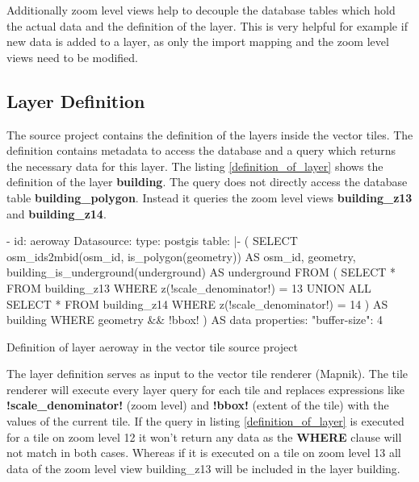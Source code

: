 Additionally zoom level views help to decouple the database tables which hold the actual data and the definition of the layer. This is very helpful for example if new data is added to a layer, as only the import mapping and the zoom level views need to be modified.

\subsection{Layer Definition}

The source project contains the definition of the layers inside the vector tiles. The definition contains metadata to access the database and a query which returns the necessary data for this layer. The listing \autoref{definition_of_layer} shows the definition of the layer \textbf{building}. The query does not directly access the database table \textbf{building\_polygon}. Instead it queries the zoom level views \textbf{building\_z13} and \textbf{building\_z14}.

\begin{listing}[H]
\begin{yamlcode}
- id: aeroway
    Datasource: 
      type: postgis
      table: |-
        (
          SELECT osm_ids2mbid(osm_id, is_polygon(geometry)) AS osm_id,
                 geometry, building_is_underground(underground) AS underground 
          FROM (
            SELECT * FROM building_z13
            WHERE z(!scale_denominator!) = 13
            UNION ALL
            SELECT * FROM building_z14
            WHERE z(!scale_denominator!) = 14
          ) AS building WHERE geometry && !bbox!
        ) AS data
    properties: 
      "buffer-size": 4
\end{yamlcode}
\caption{Definition of layer aeroway in the vector tile source project}
\label{definition_of_layer}
\end{listing}

The layer definition serves as input to the vector tile renderer (Mapnik). The tile renderer will execute every layer query for each tile and replaces expressions like \textbf{!scale\_denominator!} (zoom level) and \textbf{!bbox!} (extent of the tile) with the values of the current tile. If the query in listing \autoref{definition_of_layer} is executed for a tile on zoom level 12 it won't return any data as the \textbf{WHERE} clause will not match in both cases.
Whereas if it is executed on a tile on zoom level 13 all data of the zoom level view building\_z13 will be included in the layer building.

